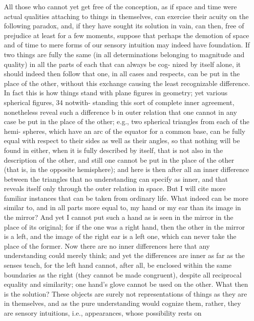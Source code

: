 All those who cannot yet get free of the conception, as if space and time
were actual qualities attaching to things in themselves, can exercise their
acuity on the following paradox, and, if they have sought its solution in
vain, can then, free of prejudice at least for a few moments, suppose that
perhaps the demotion of space and of time to mere forms of our sensory
intuition may indeed have foundation.
If two things are fully the same (in all determinations belonging to
magnitude and quality) in all the parts of each that can always be cog-
nized by itself alone, it should indeed then follow that one, in all cases
and respects, can be put in the place of the other, without this exchange
causing the least recognizable difference. In fact this is how things stand
with plane ﬁgures in geometry; yet various spherical ﬁgures, 34 notwith-
standing this sort of complete inner agreement, nonetheless reveal such
a difference b in outer relation that one cannot in any case be put in the
place of the other; e.g., two spherical triangles from each of the hemi-
spheres, which have an arc of the equator for a common base, can be fully
equal with respect to their sides as well as their angles, so that nothing
will be found in either, when it is fully described by itself, that is not also
in the description of the other, and still one cannot be put in the place
of the other (that is, in the opposite hemisphere); and here is then after
all an inner difference between the triangles that no understanding can
specify as inner, and that reveals itself only through the outer relation
in space. But I will cite more familiar instances that can be taken from
ordinary life.
What indeed can be more similar to, and in all parts more equal to, my
hand or my ear than its image in the mirror? And yet I cannot put such a
hand as is seen in the mirror in the place of its original; for if the one was a
right hand, then the other in the mirror is a left, and the image of the right
ear is a left one, which can never take the place of the former. Now there
are no inner differences here that any understanding could merely think;
and yet the differences are inner as far as the senses teach, for the left hand
cannot, after all, be enclosed within the same boundaries as the right (they
cannot be made congruent), despite all reciprocal equality and similarity;
one hand’s glove cannot be used on the other. What then is the solution?
These objects are surely not representations of things as they are in
themselves, and as the pure understanding would cognize them, rather,
they are sensory intuitions, i.e., appearances, whose possibility rests on
